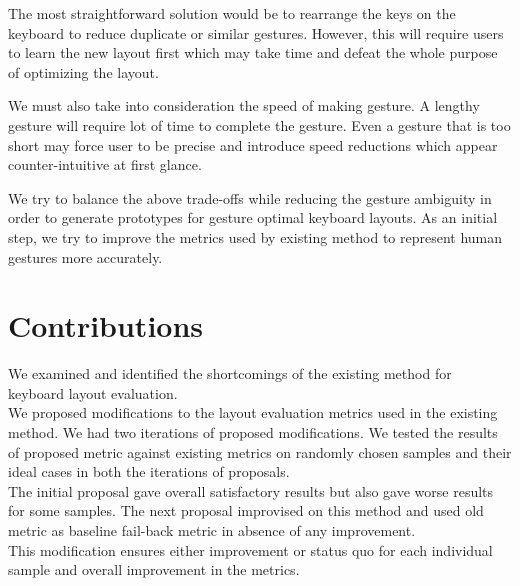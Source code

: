 \documentclass[MTech]{iitmdiss}
\begin{document}
The most straightforward solution would be to rearrange the keys on the keyboard to reduce duplicate or similar gestures. However, this will require users to learn the new layout first which may take time and defeat the whole purpose of optimizing the layout.


We must also take into consideration the speed of making gesture. A lengthy gesture will require lot of time to complete the gesture. Even a gesture that is too short may force user to be precise and introduce speed reductions which appear counter-intuitive at first glance.


We try to balance the above trade-offs while reducing the gesture ambiguity in order to generate prototypes for gesture optimal keyboard layouts. As an initial step, we try to improve the metrics used by existing method to represent human gestures more accurately.

\section{Contributions}
We examined and identified the shortcomings of the existing method for keyboard layout evaluation.\\
We proposed modifications to the layout evaluation metrics used in the existing method. We had two iterations of proposed modifications. We tested the results of proposed metric against existing metrics on randomly chosen samples and their ideal cases in both the iterations of proposals.\\ 
The initial proposal gave overall satisfactory results but also gave worse results for some samples. The next proposal improvised on this method and used old metric as baseline fail-back metric in absence of any improvement.\\
This modification ensures either improvement or status quo for each individual sample and overall improvement in the metrics. 
\end{document}

